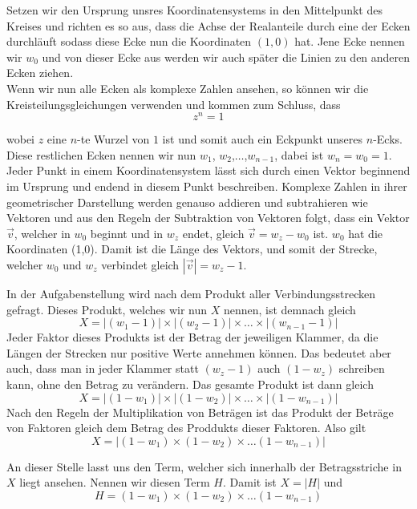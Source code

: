 \documentclass[a4paper,12pt]{article} %
\begin{document}
Setzen wir den Ursprung unsres Koordinatensystems in den Mittelpunkt des Kreises und richten es so aus, dass die Achse der Realanteile durch eine der Ecken durchläuft sodass diese Ecke nun die Koordinaten $(1,0)$ hat.
Jene Ecke nennen wir $w_0$ und von dieser Ecke aus werden wir auch später die Linien zu den anderen Ecken ziehen.\\

Wenn wir nun alle Ecken als komplexe Zahlen ansehen, so können wir die Kreisteilungsgleichungen verwenden und kommen zum Schluss, dass
\begin{equation}
	z^n=1
\end{equation}

wobei $z$ eine $n$-te Wurzel von $1$ ist und somit auch ein Eckpunkt unseres $n$-Ecks.
Diese restlichen Ecken nennen wir nun $w_1$, $w_2$,$\dots$,$w_{n-1}$, dabei ist $w_n = w_0 = 1$.\\ 

Jeder Punkt in einem Koordinatensystem lässt sich durch einen Vektor beginnend im Ursprung und endend in diesem Punkt beschreiben. Komplexe Zahlen in ihrer geometrischer Darstellung werden genauso addieren und subtrahieren wie Vektoren und aus den Regeln der Subtraktion von Vektoren folgt, dass ein Vektor $\vec{v}$, welcher in $w_0$ beginnt und in $w_z$ endet, gleich $\vec{v}=w_z-w_0$ ist.
$w_0$ hat die Koordinaten (1,0).
Damit ist die Länge des Vektors, und somit der Strecke, welcher $w_0$ und $w_z$ verbindet gleich $|\vec{v}| = w_z - 1$.

In der Aufgabenstellung wird nach dem Produkt aller Verbindungsstrecken gefragt.
Dieses Produkt, welches wir nun $X$ nennen, ist demnach gleich
\[X = |(w_1-1)|\times|(w_2-1)|\times\dots\times|(w_{n-1}-1)|\]
Jeder Faktor dieses Produkts ist der Betrag der jeweiligen Klammer, da die Längen der Strecken nur positive Werte annehmen können.
Das bedeutet aber auch, dass man in jeder Klammer statt $(w_z-1)$ auch $(1-w_z)$ schreiben kann, ohne den Betrag zu verändern.
Das gesamte Produkt ist dann gleich 
\[X=|(1-w_1)|\times|(1-w_2)|\times\dots\times|(1-w_{n-1})|\]
Nach den Regeln der Multiplikation von Beträgen ist das Produkt der Beträge von Faktoren gleich dem Betrag des Proddukts dieser Faktoren. Also gilt
\begin{equation}\label{X}
	X=|(1-w_1)\times(1-w_2)\times\dots(1-w_{n-1})|
\end{equation}

An dieser Stelle lasst uns den Term, welcher sich innerhalb der Betragsstriche in $X$ liegt ansehen.
Nennen wir diesen Term $H$. Damit ist $X=|H|$ und
\begin{equation}\label{H}
	H=(1-w_1)\times(1-w_2)\times\dots(1-w_{n-1})
\end{equation}
\end{document}
